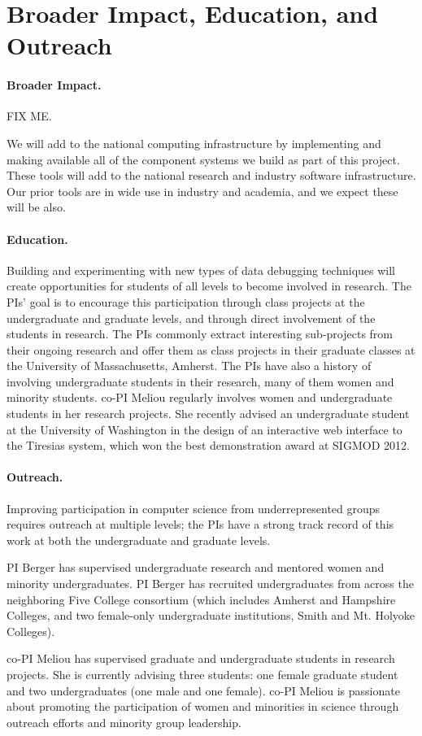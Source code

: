 \section{Broader Impact, Education, and Outreach}
\label{sec:impact}

\paragraph{Broader Impact.} 
FIX ME.

We will add to the national computing infrastructure by implementing
and making available all of the component
systems we build as part of this project.  These tools will add to the national research and industry
software infrastructure. Our prior tools are in wide use in industry
and academia, and we expect these will be also.

\paragraph{Education.}
Building and experimenting with new types of data debugging techniques will create opportunities for students of all levels to become involved in research. The PIs' goal is to encourage this participation through class projects at the undergraduate and graduate levels, and through direct involvement of the students in research. The PIs commonly extract interesting sub-projects from their ongoing research and offer them as class projects in their graduate classes at the University of Massachusetts, Amherst. The PIs have also a history of involving undergraduate students in their research, many of them women and minority students. co-PI Meliou regularly involves women and undergraduate students in her research projects. She recently advised an undergraduate student at the University of Washington in the design of an interactive web interface to the Tiresias system, which won the best demonstration award at SIGMOD 2012. 



\paragraph{Outreach.}
Improving participation in computer science from underrepresented groups
requires outreach at multiple levels; the PIs have a strong track record
of this work at both the undergraduate and graduate levels.

PI Berger has supervised undergraduate research and
mentored women and minority undergraduates. PI Berger has recruited undergraduates from
across the neighboring Five College consortium (which includes Amherst
and Hampshire Colleges, and two female-only undergraduate institutions,
Smith and Mt. Holyoke Colleges).

co-PI Meliou has supervised graduate and undergraduate students in research projects. She is currently advising three students: one female graduate student and two undergraduates (one male and one female). co-PI Meliou is passionate about promoting the participation of women and minorities in science through outreach efforts and minority group leadership.

